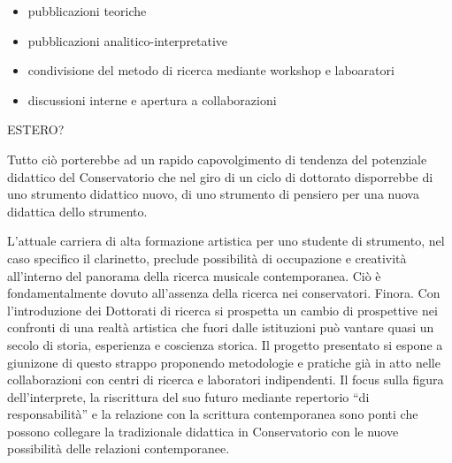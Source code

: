 \documentclass{gs-adonis}
\begin{document}

\begin{itemize}
  \item pubblicazioni teoriche
  \item pubblicazioni analitico-interpretative
  \item condivisione del metodo di ricerca mediante workshop e laboaratori
  \item discussioni interne e apertura a collaborazioni
\end{itemize}

ESTERO?

Tutto ciò porterebbe ad un rapido capovolgimento di tendenza del potenziale
didattico del Conservatorio che nel giro di un ciclo di dottorato disporrebbe
di uno strumento didattico nuovo, di uno strumento di pensiero per una nuova
didattica dello strumento.


L'attuale carriera di alta formazione artistica per uno studente di strumento,
nel caso specifico il clarinetto, preclude possibilità di occupazione e
creatività all'interno del panorama della ricerca musicale contemporanea. Ciò
è fondamentalmente dovuto all'assenza della ricerca nei conservatori. Finora.
Con l'introduzione dei Dottorati di ricerca si prospetta un cambio di
prospettive nei confronti di una realtà artistica che fuori dalle istituzioni
può vantare quasi un secolo di storia, esperienza e coscienza storica. Il
progetto presentato si espone a giunizone di questo strappo proponendo
metodologie e pratiche già in atto nelle collaborazioni con centri di ricerca e
laboratori indipendenti. Il focus sulla figura dell'interprete, la riscrittura
del suo futuro mediante repertorio “di responsabilità” e la relazione con
la scrittura contemporanea sono ponti che possono collegare la tradizionale
didattica in Conservatorio con le nuove possibilità delle relazioni
contemporanee.

\clearpage
\raggedright
\nocite{*}
%
\printbibliography
\end{document}
